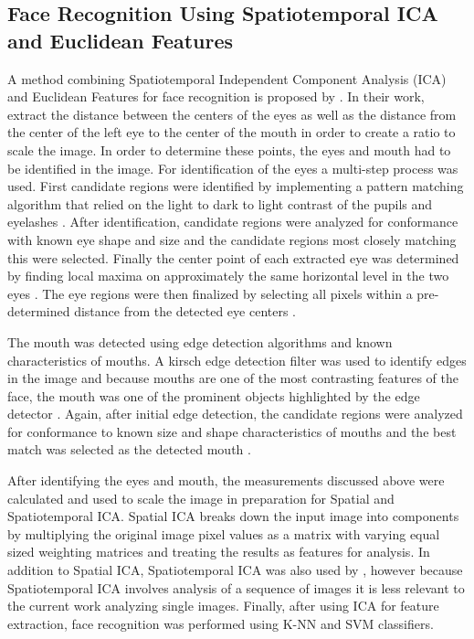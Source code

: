 \subsection{Face Recognition Using Spatiotemporal ICA and Euclidean Features}
A method combining Spatiotemporal Independent Component Analysis (ICA) and Euclidean Features for face recognition is proposed by \cite{lei2006combination}. In their work, \cite{lei2006combination} extract the distance between the centers of the eyes as well as the distance from the center of the left eye to the center of the mouth in order to create a ratio to scale the image. In order to determine these points, the eyes and mouth had to be identified in the image. For identification of the eyes a multi-step process was used. First candidate regions were identified by implementing a pattern matching algorithm that relied on the light to dark to light contrast of the pupils and eyelashes \cite{lei2006combination}. After identification, candidate regions were analyzed for conformance with known eye shape and size and the candidate regions most closely matching this were selected. Finally the center point of each extracted eye was determined by finding local maxima on approximately the same horizontal level in the two eyes \cite{lei2006combination}. The eye regions were then finalized by selecting all pixels within a pre-determined distance from the detected eye centers \cite{lei2006combination}.

The mouth was detected using edge detection algorithms and known characteristics of mouths. A kirsch edge detection filter was used to identify edges in the image and because mouths are one of the most contrasting features of the face, the mouth was one of the prominent objects highlighted by the edge detector \cite{lei2006combination}. Again, after initial edge detection, the candidate regions were analyzed for conformance to known size and shape characteristics of mouths and the best match was selected as the detected mouth \cite{lei2006combination}. 

After identifying the eyes and mouth, the measurements discussed above were calculated and used to scale the image in preparation for Spatial and Spatiotemporal ICA. Spatial ICA breaks down the input image into components by multiplying the original image pixel values as a matrix with varying equal sized weighting matrices and treating the results as features for analysis. In addition to Spatial ICA, Spatiotemporal ICA was also used by \cite{lei2006combination}, however because Spatiotemporal ICA involves analysis of a sequence of images it is less relevant to the current work analyzing single images. Finally, after using ICA for feature extraction, face recognition was performed using K-NN and SVM classifiers.  




